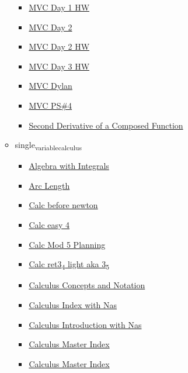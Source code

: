 \documentclass[11pt]{article}
\begin{document}
\begin{itemize}
\begin{itemize}
\begin{itemize}
\item \href{mathematics/multi\_variable\_calculus/KBdMATH520Day1HW.org}{MVC Day 1 HW}
\item \href{mathematics/multi\_variable\_calculus/KBdMATH520Day2.org}{MVC Day 2}
\item \href{mathematics/multi\_variable\_calculus/KBdMATH520Day2HW.org}{MVC Day 2 HW}
\item \href{mathematics/multi\_variable\_calculus/KBdMATH520Day3HW.org}{MVC Day 3 HW}
\item \href{mathematics/multi\_variable\_calculus/KBdMATH520Dylan.org}{MVC Dylan}
\item \href{mathematics/multi\_variable\_calculus/KBdMATH520PS4.org}{MVC PS\#4}
\item \href{mathematics/multi\_variable\_calculus/KBrefSecondDerivativeOfComposedFunctions.org}{Second Derivative of a Composed Function}
\end{itemize}
\item single\textsubscript{variable}\textsubscript{calculus}
\begin{itemize}
\item \href{mathematics/single\_variable\_calculus/KBrefIntegralAlgebra.org}{Algebra with Integrals}
\item \href{mathematics/single\_variable\_calculus/KBrefArcLength.org}{Arc Length}
\item \href{mathematics/single\_variable\_calculus/KBe2020math401floCalcBeforeNewtonLeibniz.org}{Calc before newton}
\item \href{mathematics/single\_variable\_calculus/KBe20math401retEasy4.org}{Calc easy 4}
\item \href{mathematics/single\_variable\_calculus/KBxCalcMod5.org}{Calc Mod 5 Planning}
\item \href{mathematics/single\_variable\_calculus/KBe20math401ret3\_5.org}{Calc ret3\textsubscript{4} light aka 3\textsubscript{5}}
\item \href{mathematics/single\_variable\_calculus/KBe2020math401refCalcConceptsNotation.org}{Calculus Concepts and Notation}
\item \href{mathematics/single\_variable\_calculus/00-Topic-KB202008250914.org}{Calculus Index with Nas}
\item \href{mathematics/single\_variable\_calculus/KBe2020math401flo1.org}{Calculus Introduction with Nas}
\item \href{mathematics/single\_variable\_calculus/KBCalculusMasterIndex.org}{Calculus Master Index}
\item \href{mathematics/single\_variable\_calculus/index.org}{Calculus Master Index}

\end{itemize}
\end{itemize}
\end{itemize}
\end{document}
